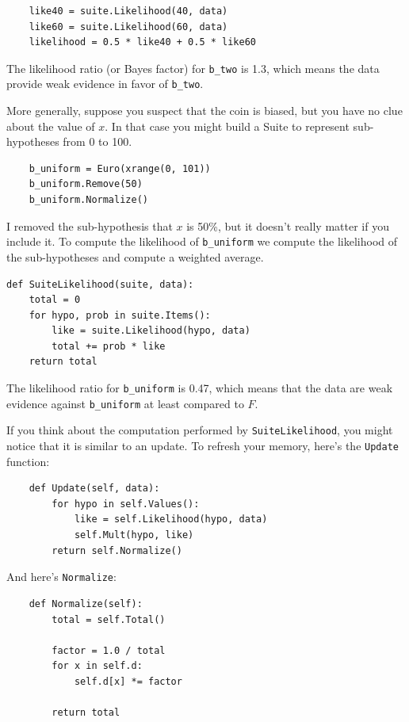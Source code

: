 \documentclass[12pt]{book}
\begin{document}
\begin{verbatim}
    like40 = suite.Likelihood(40, data)
    like60 = suite.Likelihood(60, data)
    likelihood = 0.5 * like40 + 0.5 * like60
\end{verbatim}

The likelihood ratio (or Bayes factor) for \verb"b_two" is 1.3, which
means the data provide weak evidence in favor of \verb"b_two".

More generally, suppose you suspect that the coin is biased,
but you have no clue about the value of $x$.  In that case you
might build a Suite to represent sub-hypotheses from 0 to 100.

\begin{verbatim}
    b_uniform = Euro(xrange(0, 101))
    b_uniform.Remove(50)
    b_uniform.Normalize()
\end{verbatim}

I removed the sub-hypothesis that $x$ is 50\%, but it doesn't
really matter if you include it.  To compute the likelihood of
\verb"b_uniform" we compute the likelihood of the sub-hypotheses
and compute a weighted average.

\begin{verbatim}
def SuiteLikelihood(suite, data):
    total = 0
    for hypo, prob in suite.Items():
        like = suite.Likelihood(hypo, data)
        total += prob * like
    return total
\end{verbatim}

The likelihood ratio for \verb"b_uniform" is 0.47, which means
that the data are weak evidence against \verb"b_uniform" at
least compared to $F$.

If you think about the computation performed by
\verb"SuiteLikelihood", you might notice that it is similar to an
update.  To refresh your memory, here's the {\tt Update} function:

\begin{verbatim}
    def Update(self, data):
        for hypo in self.Values():
            like = self.Likelihood(hypo, data)
            self.Mult(hypo, like)
        return self.Normalize()
\end{verbatim}

And here's {\tt Normalize}:

\begin{verbatim}
    def Normalize(self):
        total = self.Total()
        
        factor = 1.0 / total
        for x in self.d:
            self.d[x] *= factor

        return total
\end{verbatim}
\end{document}
